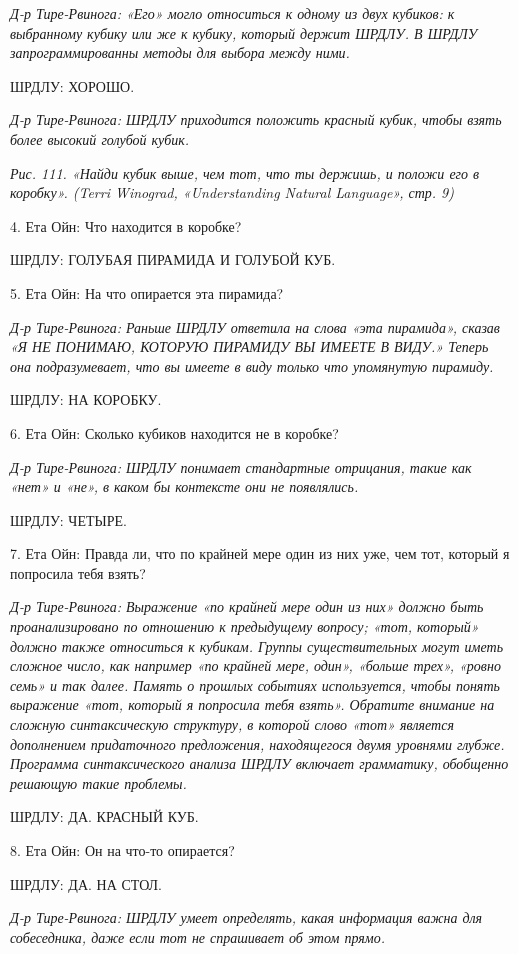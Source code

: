 \emph{Д-р Тире-Рвинога: «Его» могло относиться к одному из двух кубиков: к выбранному кубику или же к кубику, который держит ШРДЛУ. В ШРДЛУ запрограммированны методы для выбора между ними.}

ШРДЛУ: ХОРОШО.

\emph{Д-р Тире-Рвинога: ШРДЛУ приходится положить красный кубик, чтобы взять более высокий голубой кубик.}

\emph{Рис. 111. «Найди кубик выше, чем тот, что ты держишь, и положи его в коробку». (Terri Winograd, «Understanding Natural Language», стр. 9)}

4. Ета Ойн: Что находится в коробке?

ШРДЛУ: ГОЛУБАЯ ПИРАМИДА И ГОЛУБОЙ КУБ.

5. Ета Ойн: На что опирается эта пирамида?

\emph{Д-р Тире-Рвинога: Раньше ШРДЛУ ответила на слова «эта пирамида», сказав «Я НЕ ПОНИМАЮ, КОТОРУЮ ПИРАМИДУ ВЫ ИМЕЕТЕ В ВИДУ.» Теперь она подразумевает, что вы имеете в виду только что упомянутую пирамиду.}

ШРДЛУ: НА КОРОБКУ.

6. Ета Ойн: Сколько кубиков находится не в коробке?

\emph{Д-р Тире-Рвинога: ШРДЛУ понимает стандартные отрицания, такие как «нет» и «не», в каком бы контексте они не появлялись.}

ШРДЛУ: ЧЕТЫРЕ.

7. Ета Ойн: Правда ли, что по крайней мере один из них уже, чем тот, который я попросила тебя взять?

\emph{Д-р Тире-Рвинога: Выражение «по крайней мере один из них» должно быть проанализировано по отношению к предыдущему вопросу; «тот, который» должно также относиться к кубикам. Группы существительных могут иметь сложное число, как например «по крайней мере, один», «больше трех», «ровно семь» и так далее. Память о прошлых событиях используется, чтобы понять выражение «тот, который я попросила тебя взять». Обратите внимание на сложную синтаксическую структуру, в которой слово «тот» является дополнением придаточного предложения, находящегося двумя уровнями глубже. Программа синтаксического анализа ШРДЛУ включает грамматику, обобщенно решающую такие проблемы.}

ШРДЛУ: ДА. КРАСНЫЙ КУБ.

8. Ета Ойн: Он на что-то опирается?

ШРДЛУ: ДА. НА СТОЛ.

\emph{Д-р Тире-Рвинога: ШРДЛУ умеет определять, какая информация важна для собеседника, даже если тот не спрашивает об этом прямо.}

